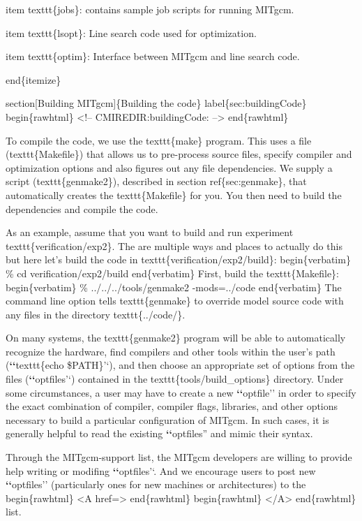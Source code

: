 \documentclass[letterpaper,10pt,english]{sphinxmanual}
\begin{document}
item texttt\{jobs\}: contains sample job scripts for running MITgcm.

item texttt\{lsopt\}: Line search code used for optimization.

item texttt\{optim\}: Interface between MITgcm and line search code.

end\{itemize\}

section{[}Building MITgcm{]}\{Building the code\}
label\{sec:buildingCode\}
begin\{rawhtml\}
\textless{}!-- CMIREDIR:buildingCode: --\textgreater{}
end\{rawhtml\}

To compile the code, we use the texttt\{make\} program. This uses a
file (texttt\{Makefile\}) that allows us to pre-process source files,
specify compiler and optimization options and also figures out any
file dependencies. We supply a script (texttt\{genmake2\}), described
in section ref\{sec:genmake\}, that automatically creates the
texttt\{Makefile\} for you. You then need to build the dependencies and
compile the code.

As an example, assume that you want to build and run experiment
texttt\{verification/exp2\}. The are multiple ways and places to
actually do this but here let's build the code in
texttt\{verification/exp2/build\}:
begin\{verbatim\}
\% cd verification/exp2/build
end\{verbatim\}
First, build the texttt\{Makefile\}:
begin\{verbatim\}
\% ../../../tools/genmake2 -mods=../code
end\{verbatim\}
The command line option tells texttt\{genmake\} to override model source
code with any files in the directory texttt\{../code/\}.

On many systems, the texttt\{genmake2\} program will be able to
automatically recognize the hardware, find compilers and other tools
within the user's path ({\color{red}\bfseries{}{}`{}`}texttt\{echo \$PATH\}'`), and then choose an
appropriate set of options from the files ({\color{red}\bfseries{}{}`{}`}optfiles'`) contained in
the texttt\{tools/build\_options\} directory.  Under some
circumstances, a user may have to create a new {\color{red}\bfseries{}{}`{}`}optfile'' in order to
specify the exact combination of compiler, compiler flags, libraries,
and other options necessary to build a particular configuration of
MITgcm.  In such cases, it is generally helpful to read the existing
{\color{red}\bfseries{}{}`{}`}optfiles'' and mimic their syntax.

Through the MITgcm-support list, the MITgcm developers are willing to
provide help writing or modifing {\color{red}\bfseries{}{}`{}`}optfiles'`.  And we encourage users
to post new {\color{red}\bfseries{}{}`{}`}optfiles'' (particularly ones for new machines or
architectures) to the
begin\{rawhtml\} \textless{}A href=\sphinxquotedblright{}\sphinxquotedblleft{}\textgreater{} end\{rawhtml\}
begin\{rawhtml\} \textless{}/A\textgreater{} end\{rawhtml\}
list.
\end{document}
